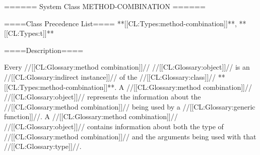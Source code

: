 ====== System Class METHOD-COMBINATION ======

====Class Precedence List==== **[[CL:Types:method-combination]]**, **[[CL:Types:t]]**

====Description====

Every //[[CL:Glossary:method combination]]// //[[CL:Glossary:object]]// is an //[[CL:Glossary:indirect instance]]// of the //[[CL:Glossary:class]]// **[[CL:Types:method-combination]]**. A //[[CL:Glossary:method combination]]// //[[CL:Glossary:object]]// represents the information about the //[[CL:Glossary:method combination]]// being used by a //[[CL:Glossary:generic function]]//. A //[[CL:Glossary:method combination]]// //[[CL:Glossary:object]]// contains information about both the type of //[[CL:Glossary:method combination]]// and the arguments being used with that //[[CL:Glossary:type]]//.

